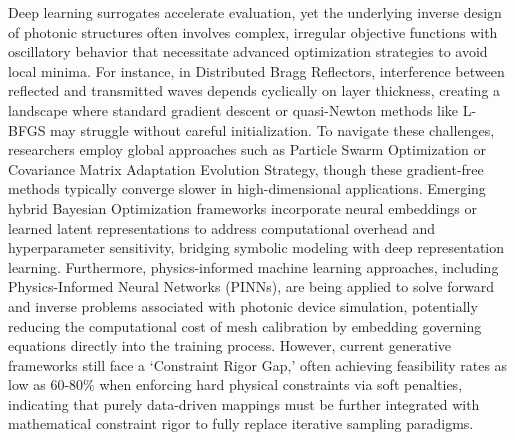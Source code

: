 \documentclass[11pt]{article}
\begin{document}
Deep learning surrogates accelerate evaluation, yet the underlying inverse design of photonic structures often involves complex, irregular objective functions with oscillatory behavior that necessitate advanced optimization strategies to avoid local minima. For instance, in Distributed Bragg Reflectors, interference between reflected and transmitted waves depends cyclically on layer thickness, creating a landscape where standard gradient descent or quasi-Newton methods like L-BFGS may struggle without careful initialization. \citep{doi_10_1515_nanoph_2020_0379_1cc596ab} To navigate these challenges, researchers employ global approaches such as Particle Swarm Optimization or Covariance Matrix Adaptation Evolution Strategy, though these gradient-free methods typically converge slower in high-dimensional applications. Emerging hybrid Bayesian Optimization frameworks incorporate neural embeddings or learned latent representations to address computational overhead and hyperparameter sensitivity, bridging symbolic modeling with deep representation learning. Furthermore, physics-informed machine learning approaches, including Physics-Informed Neural Networks (PINNs), are being applied to solve forward and inverse problems associated with photonic device simulation, potentially reducing the computational cost of mesh calibration by embedding governing equations directly into the training process. However, current generative frameworks still face a `Constraint Rigor Gap,' often achieving feasibility rates as low as 60-80\% when enforcing hard physical constraints via soft penalties, indicating that purely data-driven mappings must be further integrated with mathematical constraint rigor to fully replace iterative sampling paradigms. \citep{doi_10_48550_arxiv_2602_18148_e9c0a72b} \citep{doi_10_48550_arxiv_2511_00070_bf8eda11} \citep{doi_10_48550_arxiv_2606_12337_68b62bfa}
\end{document}
